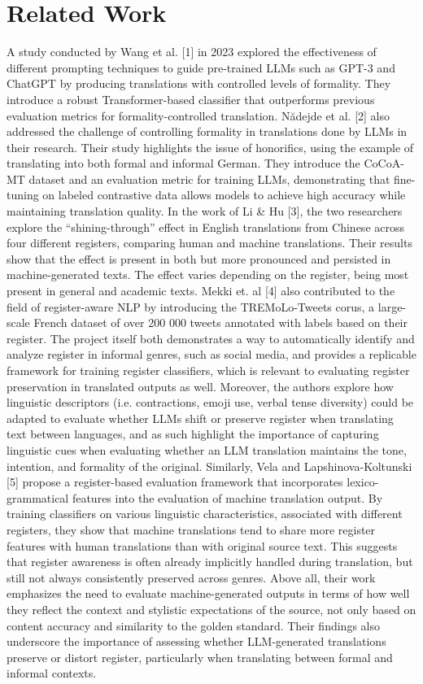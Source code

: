 \documentclass[fleqn,moreauthors,10pt]{ds_report}
\begin{document}
	\section*{Related Work}
	A study conducted by Wang et al. [1] in 2023 explored the effectiveness of different prompting techniques to guide pre-trained LLMs such as GPT-3 and ChatGPT by producing translations with controlled levels of formality. They introduce a robust Transformer-based classifier that outperforms previous evaluation metrics for formality-controlled translation. Nădejde et al. [2] also addressed the challenge of controlling formality in translations done by LLMs in their research. Their study highlights the issue of honorifics, using the example of translating \grqq into both formal and informal German. They introduce the CoCoA-MT dataset and an evaluation metric for training LLMs, demonstrating that fine-tuning on labeled contrastive data allows models to achieve high accuracy while maintaining translation quality. 
	In the work of Li \& Hu [3], the two researchers explore the “shining-through” effect in English translations from Chinese across four different registers, comparing human and machine translations. Their results show that the effect is present in both but more pronounced and persisted in machine-generated texts. The effect varies depending on the register, being most present in general and academic texts. 
	Mekki et. al [4] also contributed to the field of register-aware NLP by introducing the TREMoLo-Tweets corus, a large-scale French dataset of over 200 000 tweets annotated with labels based on their register. The project itself both demonstrates a way to automatically identify and analyze register in informal genres, such as social media, and provides a replicable framework for training register classifiers, which is relevant to evaluating register preservation in translated outputs as well. Moreover, the authors explore how linguistic descriptors (i.e. contractions, emoji use, verbal tense diversity) could be adapted to evaluate whether LLMs shift or preserve register when translating text between languages, and as such highlight the importance of capturing linguistic cues when evaluating whether an LLM translation maintains the tone, intention, and formality of the original.
	Similarly, Vela and Lapshinova-Koltunski [5] propose a register-based evaluation framework that incorporates lexico-grammatical features into the evaluation of machine translation output. By training classifiers on various linguistic characteristics, associated with different registers, they show that machine translations tend to share more register features with human translations than with original source text. This suggests that register awareness is often already implicitly handled during translation, but still not always consistently preserved across genres. Above all, their work emphasizes the need to evaluate machine-generated outputs in terms of how well they reflect the context and stylistic expectations of the source, not only based on content accuracy and similarity to the golden standard. Their findings also underscore the importance of assessing whether LLM-generated translations preserve or distort register, particularly when translating between formal and informal contexts.
	
\end{document}
